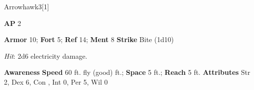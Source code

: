 \begin{monsection}{Arrowhawk}{3}[1]
\vspace{-1em}\vspace{-1em}
\begin{spellcontent}
\begin{spelltargetinginfo}
{\textbf{AP} 2}

\pari \textbf{Armor} 10;
\textbf{Fort} 5;
\textbf{Ref} 14;
\textbf{Ment} 8
\pari \textbf{Strike} Bite  (1d10)



\end{spelltargetinginfo}


\begin{spelleffects}

\pari

\par


\par \textit{Hit}: 2d6 electricity damage.


\end{spelleffects}

\end{spellcontent}

\begin{monsterfooter}
\pari \textbf{Awareness} 
\pari \textbf{Speed} 60 ft. fly (good) ft.;
\textbf{Space} 5 ft.;
\textbf{Reach} 5 ft.
\pari \textbf{Attributes}
Str 2,
Dex 6,
Con ,
Int 0,
Per 5,
Wil 0
\end{monsterfooter}
\end{monsection}




